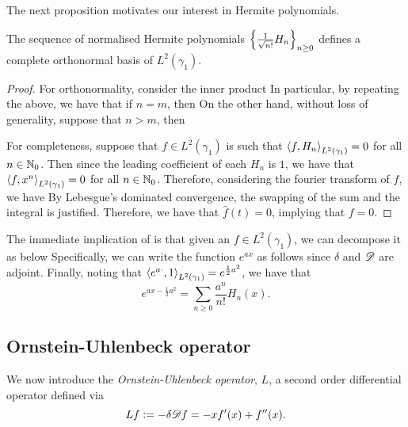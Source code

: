 \documentclass[../main.tex]{subfiles}
\begin{document}
The next proposition motivates our interest in Hermite polynomials.
\begin{proposition}
\label{prop:Hermite_basis}
The sequence of normalised Hermite polynomials $\cbr{\frac{1}{\sqrt{n!}}H_n}_{n\geq0}$ defines a complete orthonormal basis of $L^2(\gamma_1)$.
\end{proposition}
\begin{proof}
For orthonormality, consider the inner product  In particular, by repeating the above, we have that if $n=m$, then  On the other hand, without loss of generality, suppose that $n>m$, then 

For completeness, suppose that $f\in L^2(\gamma_1)$ is such that $\left\langle f,H_n \right\rangle_{L^2(\gamma_1)} = 0$ for all $n\in \operatorname{\mathbb{N}}_0$. Then since the leading coefficient of each $H_n$ is $1$, we have that $\left\langle f,x^n \right\rangle_{L^2(\gamma_1)} = 0$ for all $n\in\operatorname{\mathbb{N}}_0$. Therefore, considering the fourier transform of $f$, we have  By Lebesgue's dominated convergence, the swapping of the sum and the integral is justified. Therefore, we have that $\hat f(t) = 0$, implying that $f = 0$.
\end{proof}

The immediate implication of  is that given an $f\in L^2(\gamma_1)$, we can decompose it as below  Specifically, we can write the function $e^{ax}$ as follows  since $\delta$ and $\mathscr{D}$ are adjoint. Finally, noting that $\left\langle e^{a\cdot},1 \right\rangle_{L^2(\gamma_1)} = e^{\frac12a^2}$, we have that
\begin{equation}
    \label{eq:1d_exp_decomposition}
    e^{ax - \frac12a^2} = \sum_{n\geq0}\frac{a^n}{n!}H_n(x).
\end{equation}

\subsection{Ornstein-Uhlenbeck operator}
We now introduce the \emph{Ornstein-Uhlenbeck operator}, $L$, a second order differential operator defined via
\begin{equation}
    \label{eq:1d_OU_operator}
    Lf := -\delta\mathscr{D} f = -xf'(x) + f''(x).
\end{equation}
\end{document}
